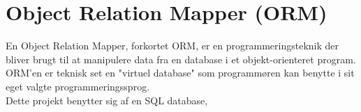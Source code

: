 \section{Object Relation Mapper (ORM)}
En Object Relation Mapper, forkortet ORM, er en programmeringsteknik der bliver brugt til
at manipulere data fra en database i et objekt-orienteret program. ORM'en er teknisk set en 
"virtuel database" som programmøren kan benytte i sit eget valgte programmeringssprog. \\

Dette projekt benytter sig af en SQL database, 